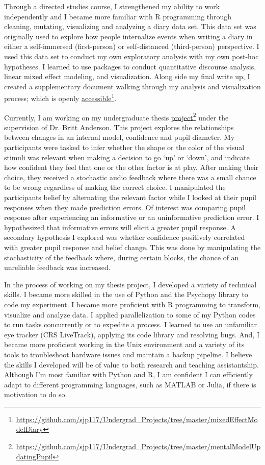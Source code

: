 \documentclass[12pt]{article}
\begin{document}
	Through a directed studies course, I strengthened my ability to work independently and I became more familiar with R programming through cleaning, mutating, visualizing and analyzing a diary data set. This data set was originally used to explore how people internalize events when writing a diary in either a self-immersed (first-person) or self-distanced (third-person) perspective. I used this data set to conduct my own exploratory analysis with my own post-hoc hypotheses. I learned to use packages to conduct quantitative discourse analysis, linear mixed effect modeling, and visualization. Along side my final write up, I created a supplementary document walking through my analysis and visualization process; which is openly  \href{https://github.com/sjp117/Undergrad_Projects/tree/master/mixedEffectModelDiary}{accessible}\footnote{\url{https://github.com/sjp117/Undergrad\_Projects/tree/master/mixedEffectModelDiary}}.
	
	Currently, I am working on my undergraduate thesis \href{https://github.com/sjp117/Undergrad_Projects/tree/master/mentalModelUpdatingPupil}{project}\footnote{\url{https://github.com/sjp117/Undergrad\_Projects/tree/master/mentalModelUpdatingPupil}} under the supervision of Dr. Britt Anderson. This project explores the relationships between changes in an internal model, confidence and pupil diameter. My participants were tasked to infer whether the shape or the color of the visual stimuli was relevant when making a decision to go `up' or `down', and indicate how confident they feel that one or the other factor is at play. After making their choice, they received a stochastic audio feedback where there was a small chance to be wrong regardless of making the correct choice. I manipulated the participants belief by alternating the relevant factor while I looked at their pupil responses when they made prediction errors. Of interest was comparing pupil response after experiencing an informative or an uninformative prediction error. I hypothesized that informative errors will elicit a greater pupil response. A secondary hypothesis I explored was whether confidence positively correlated with greater pupil response and belief change. This was done by manipulating the stochasticity of the feedback where, during certain blocks, the chance of an unreliable feedback was increased.
	
	In the process of working on my thesis project, I developed a variety of technical skills. I became more skilled in the use of Python and the Psychopy library to code my experiment. I became more proficient with R programming to transform, visualize and analyze data. I applied parallelization to some of my Python codes to run tasks concurrently or to expedite a process. I learned to use an unfamiliar eye tracker (CRS LiveTrack), applying its code library and resolving bugs. And, I became more proficient working in the Unix environment and a variety of its tools to troubleshoot hardware issues and maintain a backup pipeline. I believe the skills I developed will be of value to both research and teaching assistantship. Although I’m most familiar with Python and R, I am confident I can efficiently adapt to different programming languages, such as MATLAB or Julia, if there is motivation to do so.
	
\end{document}
